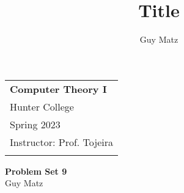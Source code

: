 \documentclass[12pt]{scrbook}
\author{Guy Matz}
\begin{document}
	
	
\title{Title}
\setlength{\parindent}{0pt} %
\onehalfspacing        %

\begin{tabular}{p{15.5cm}}
    {\large \textbf{Computer Theory I}} \\
  Hunter College \\
  Spring 2023  \\
  Instructor: Prof. Tojeira\\
  \hline
  \\
\end{tabular}

\vspace*{0.3cm}        %

\begin{center}
  {\Large \textbf{Problem Set 9}}
  \vspace{2mm}\\
  Guy Matz
\end{center}

\vspace{0.4cm}
\end{document}

